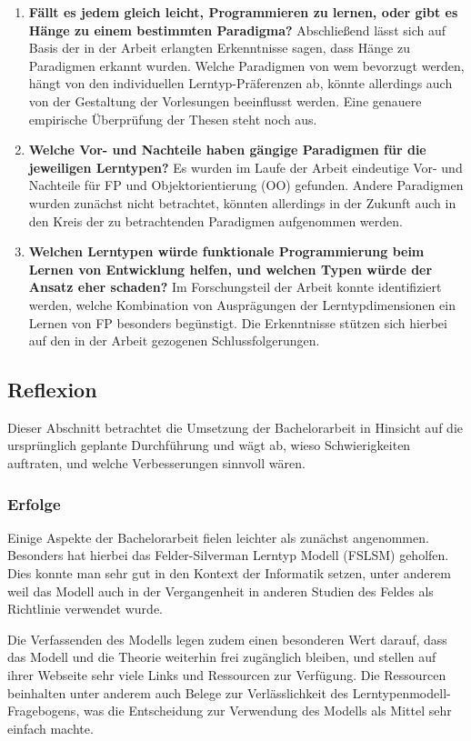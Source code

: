 \begin{enumerate}
    \item \textbf{Fällt es jedem gleich leicht, Programmieren zu lernen, oder gibt es Hänge zu einem bestimmten Paradigma?} Abschließend lässt sich auf Basis der in der Arbeit erlangten Erkenntnisse sagen, dass Hänge zu Paradigmen erkannt wurden. Welche Paradigmen von wem bevorzugt werden, hängt von den individuellen Lerntyp-Präferenzen ab, könnte allerdings auch von der Gestaltung der Vorlesungen beeinflusst werden. Eine genauere empirische Überprüfung der Thesen steht noch aus.
    \item \textbf{Welche Vor- und Nachteile haben gängige Paradigmen für die jeweiligen Lerntypen?} Es wurden im Laufe der Arbeit eindeutige Vor- und Nachteile für FP und Objektorientierung (OO) gefunden. Andere Paradigmen wurden zunächst nicht betrachtet, könnten allerdings in der Zukunft auch in den Kreis der zu betrachtenden Paradigmen aufgenommen werden.
    \item \textbf{Welchen Lerntypen würde funktionale Programmierung beim Lernen von Entwicklung helfen, und welchen Typen würde der Ansatz eher schaden?} Im Forschungsteil der Arbeit konnte identifiziert werden, welche Kombination von Ausprägungen der Lerntypdimensionen ein Lernen von FP besonders begünstigt. Die Erkenntnisse stützen sich hierbei auf den in der Arbeit gezogenen Schlussfolgerungen.
\end{enumerate}

\subsection{Reflexion}
Dieser Abschnitt betrachtet die Umsetzung der Bachelorarbeit in Hinsicht auf die ursprünglich geplante Durchführung und wägt ab, wieso Schwierigkeiten auftraten, und welche Verbesserungen sinnvoll wären.

\subsubsection{Erfolge}
Einige Aspekte der Bachelorarbeit fielen leichter als zunächst angenommen. Besonders hat hierbei das Felder-Silverman Lerntyp Modell (FSLSM) geholfen. Dies konnte man sehr gut in den Kontext der Informatik setzen, unter anderem weil das Modell auch in der Vergangenheit in anderen Studien des Feldes als Richtlinie verwendet wurde.

Die Verfassenden des Modells legen zudem einen besonderen Wert darauf, dass das Modell und die Theorie weiterhin frei zugänglich bleiben, und stellen auf ihrer Webseite sehr viele Links und Ressourcen zur Verfügung. Die Ressourcen beinhalten unter anderem auch Belege zur Verlässlichkeit des Lerntypenmodell-Fragebogens, was die Entscheidung zur Verwendung des Modells als Mittel sehr einfach machte.

